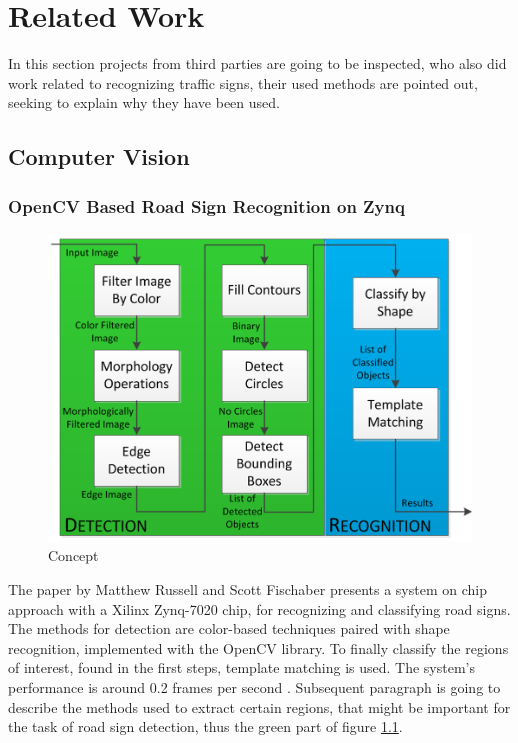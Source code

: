 
\chapter{Related Work}\label{chapter:Related Work}
In this section projects from third parties are going to be inspected, who also did work related to recognizing traffic signs, their used methods are pointed out, seeking to explain why they have been used.

\section{Computer Vision}
\subsection{OpenCV Based Road Sign Recognition on Zynq}\label{zynq}
\begin{figure}[H]
	\centering
	\includegraphics[width=\linewidth]{images/zynqconcept.png}
	\caption{Concept \cite{zynq}}\label{fig:zynq}
	\endminipage\hfill
\end{figure}
The paper by Matthew Russell and Scott Fischaber presents a system on chip approach with a Xilinx Zynq-7020 chip, for recognizing and classifying road signs. The methods for detection are color-based techniques paired with shape recognition, implemented with the OpenCV library. To finally classify the regions of interest, found in the first steps, template matching is used. The system's performance is around 0.2 frames per second \cite{zynq}. Subsequent paragraph is going to describe the methods used to extract certain regions, that might be important for the task of road sign detection, thus the green part of figure \ref{fig:zynq}. \newline
